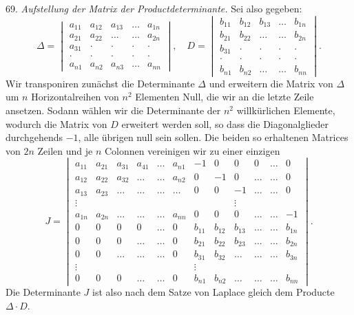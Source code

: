 69. \textit{Aufstellung der Matrix der Productdeterminante.} Sei also
gegeben:
\[
\Delta = \begin{vmatrix}
a_{11} & a_{12} & a_{13} & \dots & a_{1n} \\
a_{21} & a_{22} & \dots & \dots & a_{2n} \\
a_{31} & \cdot & \cdot & \cdot & \cdot \\
\cdot & \cdot & \cdot & \cdot & \cdot \\
a_{n1} & a_{n2} & a_{n3} & \dots & a_{nn}
\end{vmatrix},
\quad
D = \begin{vmatrix}
b_{11} & b_{12} & b_{13} & \dots & b_{1n} \\
b_{21} & b_{22} & \dots & \dots & b_{2n} \\
b_{31} & \cdot & \cdot & \cdot & \cdot \\
\cdot & \cdot & \cdot & \cdot & \cdot \\
b_{n1} & b_{n2} & \dots & \dots & b_{nn}
\end{vmatrix}.
\]
Wir transponiren zunächst die Determinante $\Delta$ und erweitern die
Matrix von $\Delta$ um $n$ Horizontalreihen von $n^2$ Elementen Null,
die wir an die letzte Zeile ansetzen. Sodann wählen wir die
Determinante der $n^2$ willkürlichen Elemente, wodurch die Matrix von
$D$ erweitert werden soll, so dass die Diagonalglieder durchgehends
$-1$, alle übrigen null sein sollen. Die beiden so erhaltenen Matrices
von $2n$ Zeilen und je $n$ Colonnen vereinigen wir zu einer einzigen
\[
J = \begin{vmatrix}
a_{11} & a_{21} & a_{31} & a_{41} & \dots & a_{n1} & -1 & 0 & 0 & 0 & \dots & 0 \\
a_{12} & a_{22} & a_{32} & \dots & \dots & a_{n2} & 0 & -1 & 0 & \dots & \dots & 0 \\
a_{13} & a_{23} & \dots & \dots & \dots & \dots & 0 & 0 & -1 & \dots & \dots & 0 \\
\vdots & & & & & & & & \vdots & & & \\
a_{1n} & a_{2n} & \dots & \dots & \dots & a_{nn} & 0 & 0 & 0 & \dots & \dots & -1 \\
0 & 0 & 0 & 0 & \dots & 0 & b_{11} & b_{12} & b_{13} & \dots & \dots & b_{1n} \\
0 & 0 & 0 & \dots & \dots & 0 & b_{21} & b_{22} & b_{23} & \dots & \dots & b_{2n} \\
0 & 0 & \dots & \dots & \dots & 0 & b_{31} & b_{32} & \dots & \dots & \dots & b_{3n} \\
\vdots & & & & & & \vdots & & & & & \\
0 & 0 & 0 & \dots & \dots & 0 & b_{n1} & b_{n2} & \dots & \dots & \dots & b_{nn}
\end{vmatrix}.
\]
Die Determinante $J$ ist also nach dem Satze von Laplace gleich dem
Producte $\Delta \cdot D$.

